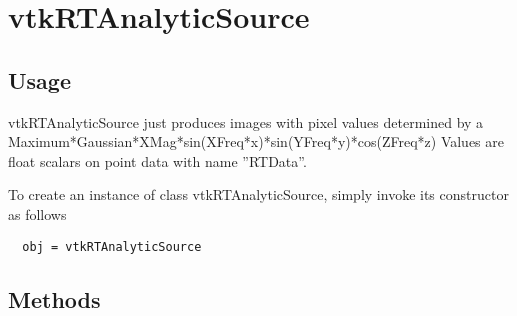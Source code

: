 \section{vtkRTAnalyticSource}

\subsection{Usage}

 vtkRTAnalyticSource just produces images with pixel values determined 
 by a Maximum*Gaussian*XMag*sin(XFreq*x)*sin(YFreq*y)*cos(ZFreq*z)
 Values are float scalars on point data with name ''RTData''.

To create an instance of class vtkRTAnalyticSource, simply
invoke its constructor as follows
\begin{verbatim}
  obj = vtkRTAnalyticSource
\end{verbatim}
\subsection{Methods}

